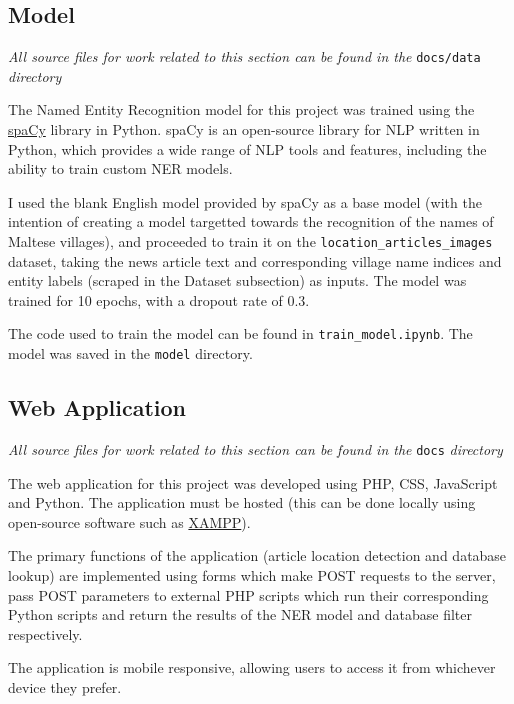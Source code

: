 \documentclass[a4paper, oneside, 11pt]{article}
\begin{document}
\begin{multicols*}{2}
  \subsection{Model}
  \textit{All source files for work related to this section can be found in the} \verb|docs/data| \textit{directory}

  \medskip

  The Named Entity Recognition model for this project was trained using the \href{}{spaCy} library in Python. spaCy is an open-source library for NLP written in Python, which provides a wide range of NLP tools and features, including the ability to train custom NER models.

  I used the blank English model provided by spaCy as a base model (with the intention of creating a model targetted towards the recognition of the names of Maltese villages), and proceeded to train it on the \verb|location_articles_images| dataset, taking the news article text and corresponding village name indices and entity labels (scraped in the Dataset subsection) as inputs. The model was trained for 10 epochs, with a dropout rate of 0.3.

  The code used to train the model can be found in \verb|train_model.ipynb|. The model was saved in the \verb|model| directory.


  \subsection{Web Application}
  \textit{All source files for work related to this section can be found in the} \verb|docs| \textit{directory}

  \medskip

  The web application for this project was developed using PHP, CSS, JavaScript and Python. The application must be hosted (this can be done locally using open-source software such as \href{https://www.apachefriends.org/}{XAMPP}).

  The primary functions of the application (article location detection and database lookup) are implemented using forms which make POST requests to the server, pass POST parameters to external PHP scripts which run their corresponding Python scripts and return the results of the NER model and database filter respectively.

  The application is mobile responsive, allowing users to access it from whichever device they prefer.


\end{multicols*}
\end{document}
